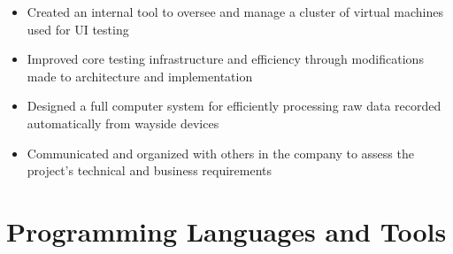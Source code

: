 \documentclass[11pt,letterpaper,sans]{moderncv}        %
\begin{document}
\begin{itemize}
\item Created an internal tool to oversee and manage a cluster of virtual machines used for UI testing
\item Improved core testing infrastructure and efficiency through modifications made to architecture and implementation
\end{itemize}

\begin{itemize}
\item Designed a full computer system for efficiently processing raw data recorded automatically from wayside devices
\item Communicated and organized with others in the company to assess the project's technical and business requirements
\end{itemize}

\section{Programming Languages and Tools}

\begin{cvcolumns}
\end{cvcolumns}
\end{document}
